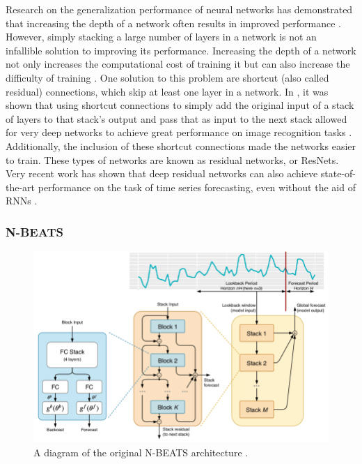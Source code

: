 Research on the generalization performance of neural networks has demonstrated that increasing the depth of a network often results in improved performance \cite{szegedy2015going, krizhevsky2012imagenet}. However, simply stacking a large number of layers in a network is not an infallible solution to improving its performance. Increasing the depth of a network not only increases the computational cost of training it but can also increase the difficulty of training \cite{glorot2010understanding}. One solution to this problem are shortcut (also called residual) connections, which skip at least one layer in a network. In \cite{he2016deep}, it was shown that using shortcut connections to simply add the original input of a stack of layers to that stack's output and pass that as input to the next stack allowed for very deep networks to achieve great performance on image recognition tasks \cite{he2016deep, Huang_2017_CVPR, he2016identity}. Additionally, the inclusion of these shortcut connections made the networks easier to train. These types of networks are known as residual networks, or ResNets. Very recent work has shown that deep residual networks can also achieve state-of-the-art performance on the task of time series forecasting, even without the aid of \ac{RNNs} \cite{oreshkin:nbeats}.

\subsubsection{N-BEATS}
\label{section:nbeats_background}

\begin{figure}[t]
    \includegraphics[width=\textwidth]{nbeats}
    \caption{A diagram of the original N-BEATS architecture \cite{oreshkin:nbeats}.}
    \label{fig:nbeats-background}
\end{figure}

